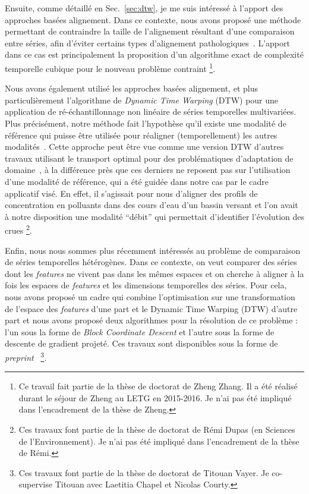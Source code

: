 \haveabreak{}

Ensuite, comme détaillé en Sec.~\ref{sec:dtw}, je me suis intéressé à l'apport
des approches basées alignement.
Dans ce contexte, nous avons proposé une méthode
permettant de contraindre la taille de l'alignement résultant d'une comparaison
entre séries, afin d'éviter certains types d'alignement
pathologiques~\cite{zhang2017dynamic}.
L'apport dans ce cas est principalement la proposition d'un algorithme exact de
complexité temporelle cubique pour le nouveau problème contraint%
\footnote{Ce travail fait partie de la thèse de doctorat de Zheng Zhang.
Il a été réalisé
durant le séjour de Zheng au LETG en 2015-2016. Je n'ai pas été impliqué dans
l'encadrement de la thèse de Zheng.}.

Nous avons également utilisé les approches basées alignement, et plus
particulièrement l'algorithme de \emph{Dynamic Time Warping} (DTW)
pour une application de ré-échantillonnage non linéaire de séries temporelles
multivariées.
Plus précisément, notre méthode fait l'hypothèse qu'il existe une modalité de
référence qui puisse être utilisée pour réaligner (temporellement)
les autres modalités~\cite{dupas:halshs-01228397}.
Cette approche peut être vue comme une version DTW d'autres travaux utilisant
le transport optimal pour des problématiques d'adaptation de
domaine~\cite{courty:hal-02112785}, à la différence près que ces derniers ne
reposent pas sur l'utilisation d'une modalité de référence, qui a été guidée
dans notre cas par le cadre applicatif visé.
En effet, il s'agissait pour nous d'aligner des profils de concentration en
polluants dans des cours d'eau d'un bassin versant et l'on avait à notre
disposition une modalité ``débit'' qui permettait d'identifier l'évolution des
crues%
\footnote{Ces travaux font partie de la thèse de doctorat de Rémi Dupas
(en Sciences de
l'Environnement). Je n'ai pas été impliqué dans l'encadrement de la thèse de
Rémi.}.

Enfin, nous nous sommes plus récemment intéressés au problème de comparaison
de séries temporelles hétérogènes.
Dans ce contexte, on veut comparer des séries dont les \emph{features}
ne vivent pas dans les mêmes espaces et on cherche à aligner à la fois les
espaces de \emph{features} et les dimensions temporelles des séries.
Pour cela, nous avons proposé un cadre qui combine l'optimisation sur une
transformation de l'espace des \emph{features} d'une part et le
Dynamic Time Warping (DTW) d'autre part et nous avons proposé deux algorithmes
pour la résolution de ce problème : l'un sous la forme de
\emph{Block Coordinate Descent} et l'autre sous la forme de descente de
gradient projeté.
Ces travaux sont disponibles sous la forme de
\emph{preprint}~\cite{vayer2020time}%
\footnote{Ces travaux font partie de la thèse de doctorat de Titouan Vayer.
Je co-supervise Titouan avec Laetitia Chapel et Nicolas Courty.}.

